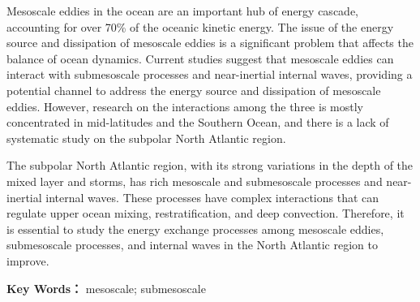 \begin{enabstract}
Mesoscale eddies in the ocean are an important hub of energy cascade, accounting for over 70\% of the oceanic kinetic energy. The issue of the energy source and dissipation of mesoscale eddies is a significant problem that affects the balance of ocean dynamics. Current studies suggest that mesoscale eddies can interact with submesoscale processes and near-inertial internal waves, providing a potential channel to address the energy source and dissipation of mesoscale eddies. However, research on the interactions among the three is mostly concentrated in mid-latitudes and the Southern Ocean, and there is a lack of systematic study on the subpolar North Atlantic region.

The subpolar North Atlantic region, with its strong variations in the depth of the mixed layer and storms, has rich mesoscale and submesoscale processes and near-inertial internal waves. These processes have complex interactions that can regulate upper ocean mixing, restratification, and deep convection. Therefore, it is essential to study the energy exchange processes among mesoscale eddies, submesoscale processes, and internal waves in the North Atlantic region to improve.

\noindent\textbf{Key Words：} mesoscale; submesoscale

\end{enabstract}
